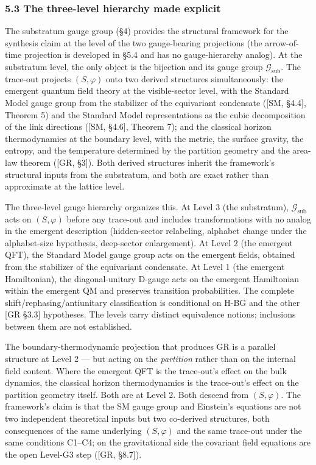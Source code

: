 \documentclass[
]{article}
\begin{document}
\hypertarget{the-three-level-hierarchy-made-explicit}{%
\subsubsection{5.3 The three-level hierarchy made
explicit}\label{the-three-level-hierarchy-made-explicit}}

The substratum gauge group (§4) provides the structural framework for
the synthesis claim at the level of the two gauge-bearing projections
(the arrow-of-time projection is developed in §5.4 and has no
gauge-hierarchy analog). At the substratum level, the only object is the
bijection and its gauge group \(\mathcal{G}_{\text{sub}}\). The
trace-out projects \((S, \varphi)\) onto two derived structures
simultaneously: the emergent quantum field theory at the visible-sector
level, with the Standard Model gauge group from the stabilizer of the
equivariant condensate ({[}SM, §4.4{]}, Theorem 5) and the Standard
Model representations as the cubic decomposition of the link directions
({[}SM, §4.6{]}, Theorem 7); and the classical horizon thermodynamics at
the boundary level, with the metric, the surface gravity, the entropy,
and the temperature determined by the partition geometry and the
area-law theorem ({[}GR, §3{]}). Both derived structures inherit the
framework's structural inputs from the substratum, and both are exact
rather than approximate at the lattice level.

The three-level gauge hierarchy organizes this. At Level 3 (the
substratum), \(\mathcal{G}_{\text{sub}}\) acts on \((S, \varphi)\)
before any trace-out and includes transformations with no analog in the
emergent description (hidden-sector relabeling, alphabet change under
the alphabet-size hypothesis, deep-sector enlargement). At Level 2 (the
emergent QFT), the Standard Model gauge group acts on the emergent
fields, obtained from the stabilizer of the equivariant condensate. At
Level 1 (the emergent Hamiltonian), the diagonal-unitary D-gauge acts on
the emergent Hamiltonian within the emergent QM and preserves transition
probabilities. The complete shift/rephasing/antiunitary classification
is conditional on H-BG and the other {[}GR §3.3{]} hypotheses. The
levels carry distinct equivalence notions; inclusions between them are
not established.

The boundary-thermodynamic projection that produces GR is a parallel
structure at Level 2 --- but acting on the \emph{partition} rather than
on the internal field content. Where the emergent QFT is the trace-out's
effect on the bulk dynamics, the classical horizon thermodynamics is the
trace-out's effect on the partition geometry itself. Both are at Level
2. Both descend from \((S, \varphi)\). The framework's claim is that the
SM gauge group and Einstein's equations are not two independent
theoretical inputs but two co-derived structures, both consequences of
the same underlying \((S, \varphi)\) and the same trace-out under the
same conditions C1--C4; on the gravitational side the covariant field
equations are the open Level-G3 step ({[}GR, §8.7{]}).
\end{document}

